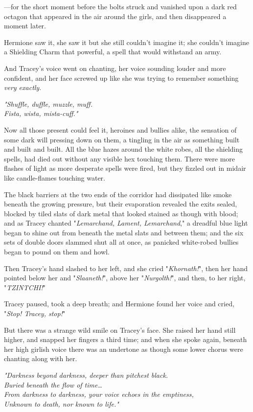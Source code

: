 ---for the short moment before the bolts struck and vanished upon a dark red 
octagon that appeared in the air around the girls, and then disappeared a 
moment later.

Hermione saw it, she saw it but she still couldn't imagine it; she couldn't 
imagine a Shielding Charm that powerful, a spell that would withstand an army.

And Tracey's voice went on chanting, her voice sounding louder and more 
confident, and her face screwed up like she was trying to remember something 
\emph{very exactly}.

\emph{"Shuffle, duffle, muzzle, muff.\\
Fista, wista, mista-cuff."}

Now all those present could feel it, heroines and bullies alike, the sensation 
of some dark will pressing down on them, a tingling in the air as something 
built and built and built. All the blue hazes around the white robes, all the 
shielding spells, had died out without any visible hex touching them. There 
were more flashes of light as more desperate spells were fired, but they 
fizzled out in midair like candle-flames touching water.

The black barriers at the two ends of the corridor had dissipated like smoke 
beneath the growing pressure, but their evaporation revealed the exits sealed, 
blocked by tiled slats of dark metal that looked stained as though with blood; 
and as Tracey chanted "\emph{Lemarchand, Lament, Lemarchand}," a dreadful blue 
light began to shine out from beneath the metal slats and between them; and the 
six sets of double doors slammed shut all at once, as panicked white-robed 
bullies began to pound on them and howl.

Then Tracey's hand slashed to her left, and she cried "\emph{Khornath!}", then 
her hand pointed below her and "\emph{Slaaneth!}", above her 
"\emph{Nurgolth!}", and then, to her right, "\emph{TZINTCHI!}"

Tracey paused, took a deep breath; and Hermione found her voice and cried, 
"\emph{Stop! Tracey, stop!}"

But there was a strange wild smile on Tracey's face. She raised her hand still 
higher, and snapped her fingers a third time; and when she spoke again, beneath 
her high girlish voice there was an undertone as though some lower chorus were 
chanting along with her.

\emph{"Darkness beyond darkness, deeper than pitchest black.\\
Buried beneath the flow of time{\ldots}\\
From darkness to darkness, your voice echoes in the emptiness,\\
Unknown to death, nor known to life."\\
}

